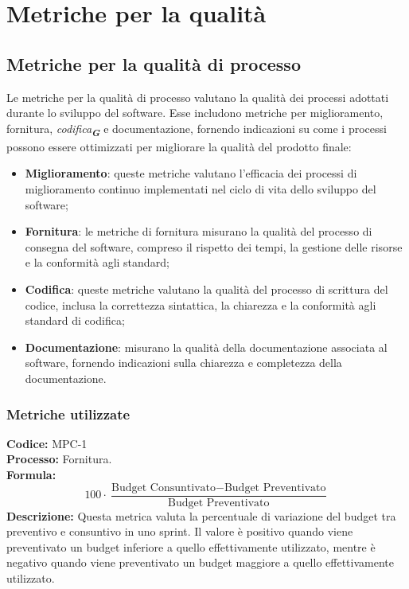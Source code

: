 
\appendix %

\section{Metriche per la qualità}
\label{sec:metriche_qualita}

\subsection{Metriche per la qualità di processo}
Le metriche per la qualità di processo valutano la qualità dei processi adottati durante 
lo sviluppo del software. Esse includono metriche per miglioramento, fornitura, 
\emph{codifica}\textsubscript{\textit{\textbf{G}}} e documentazione, fornendo indicazioni su come i processi 
possono essere ottimizzati per migliorare la qualità del prodotto finale:
\begin{itemize}
    \item \textbf{Miglioramento}: queste metriche valutano l’efficacia dei processi di miglioramento continuo implementati
    nel ciclo di vita dello sviluppo del software;
    \item \textbf{Fornitura}: le metriche di fornitura misurano la qualità del processo di consegna del software, compreso 
    il rispetto dei tempi, la gestione delle risorse e la conformità agli standard;
    \item \textbf{Codifica}: queste metriche valutano la qualità del processo di scrittura del codice, inclusa la correttezza 
    sintattica, la chiarezza e la conformità agli standard di codifica;
    \item \textbf{Documentazione}: misurano la qualità della documentazione associata al software, fornendo indicazioni sulla
    chiarezza e completezza della documentazione.
\end{itemize}

\subsubsection{Metriche utilizzate}
\textbf{Codice:} MPC-1 \\
\textbf{Processo:} Fornitura. \\
\textbf{Formula:}
\[
100 \cdot \frac{\text{Budget Consuntivato} - \text{Budget Preventivato}}{\text{Budget Preventivato}}
\]
\textbf{Descrizione:} Questa metrica valuta la percentuale di variazione del budget tra preventivo e consuntivo in uno sprint. Il valore è positivo quando viene preventivato un budget inferiore a quello effettivamente utilizzato, mentre è negativo quando viene preventivato un budget maggiore a quello effettivamente utilizzato.

